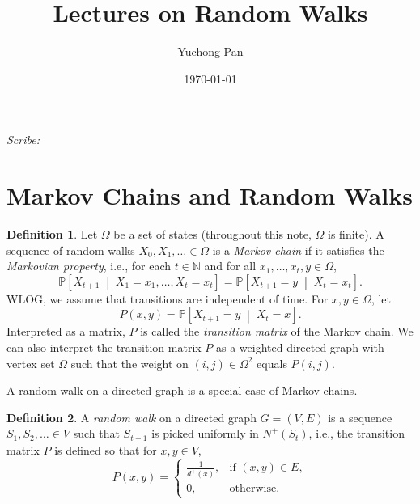 \documentclass[letterpaper, reqno,11pt]{article}
\newcommand{\NN}{\mathbb{N}}
\newcommand{\PP}{\mathbb{P}}
\begin{document}
\title{Lectures on Random Walks}
\author{Yuchong Pan}
\date{\today}
\newtheorem{theorem}{Theorem}
\newtheorem{lemma}[theorem]{Lemma}
\newtheorem{proposition}[theorem]{Proposition}
\newtheorem{corollary}[theorem]{Corollary}
\newtheorem{fact}[theorem]{Fact}
\newtheorem{problem}[theorem]{Problem}
\newtheorem{claim}{Claim}
\newtheorem{exercise}{Exercise}
\theoremstyle{definition}
\newtheorem{definition}[theorem]{Definition}
%

\begin{framed}
 \hfill \thedate
\begin{center}
\Large{\thetitle}
\end{center}
 \hfill {\em Scribe: \theauthor}
\end{framed}

\section{Markov Chains and Random Walks}

\begin{definition}
  Let $\Omega$ be a set of states (throughout this note, $\Omega$ is finite). A sequence of random walks $X_0, X_1, \ldots \in \Omega$ is a \emph{Markov chain} if it satisfies the \emph{Markovian property}, i.e., for each $t \in \NN$ and for all $x_1, \ldots, x_t, y \in \Omega$,
  $$ \PP\left[X_{t + 1} \;\middle|\; X_1 = x_1, \ldots, X_t = x_t\right] = \PP\left[X_{t + 1} = y \;\middle|\; X_t = x_t\right]. $$
  WLOG, we assume that transitions are independent of time. For $x, y \in \Omega$, let
  $$ P(x, y) = \PP\left[X_{t + 1} = y \;\middle|\; X_t = x\right]. $$
  Interpreted as a matrix, $P$ is called the \emph{transition matrix} of the Markov chain. We can also interpret the transition matrix $P$ as a weighted directed graph with vertex set $\Omega$ such that the weight on $(i, j) \in \Omega^2$ equals $P(i, j)$.
\end{definition}

A random walk on a directed graph is a special case of Markov chains.

\begin{definition}
  A \emph{random walk} on a directed graph $G = (V, E)$ is a sequence $S_1, S_2, \ldots \in V$ such that $S_{t + 1}$ is picked uniformly in $N^+(S_t)$, i.e., the transition matrix $P$ is defined so that for $x, y \in V$,
  $$ P(x, y) = \left\{
    \begin{array}{ll}
      \frac{1}{d^+(x)}, & \text{if $(x, y) \in E$}, \\
      0, & \text{otherwise}.
    \end{array}
  \right. $$
\end{definition}
\end{document}
